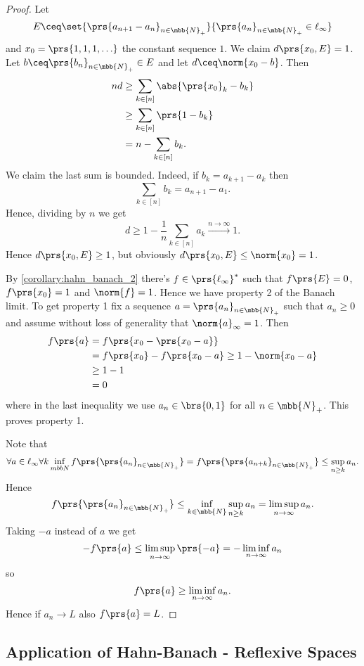 \documentclass[10pt, twoside]{book}
\begin{document}
\begin{proof}
Let
\[E \ceq \set{\prs{a_{n+1} - a_n}_{n \in \mbb{N}_+}}{\prs{a_n}_{n \in \mbb{N}_+} \in \ell_\infty}\]
and $x_0 = \prs{1, 1, 1, \ldots}$ the constant sequence $1$. We claim
$d\prs{x_0, E} = 1$.
Let $b \ceq \prs{b_n}_{n \in \mbb{N}_+} \in E$ and let $d \ceq \norm{x_0 - b}$. Then
\begin{align*}
nd &\geq \sum_{k \in [n]} \abs{\prs{x_0}_k - b_k}
\\&\geq
\sum_{k \in [n]} \prs{1 - b_k}
\\&=
n - \sum_{k \in [n]} b_k \text{.}
\end{align*}
We claim the last sum is bounded. Indeed, if $b_k = a_{k+1} - a_k$ then
\[\sum_{k \in [n]} b_k = a_{n+1} - a_1 \text{.}\]
Hence, dividing by $n$ we get
\[d \geq 1 - \frac{1}{n} \sum_{k \in [n]} a_k \xrightarrow{n \to \infty} 1 \text{.}\]
Hence $d\prs{x_0, E} \geq 1$, but obviously $d\prs{x_0, E} \leq \norm{x_0} = 1$.

By \ref{corollary:hahn_banach_2} there's $f \in \prs{\ell_\infty}^*$ such that $f\prs{E} = 0$, $f\prs{x_0} = 1$ and $\norm{f} = 1$.
Hence we have property 2 of the Banach limit. To get property 1 fix a sequence $a = \prs{a_n}_{n \in \mbb{N}_+}$ such that $a_n \geq 0$ and assume without loss of generality that $\norm{a}_{\infty} = 1$.
Then
\begin{align*}
f\prs{a} &= f\prs{x_0 - \prs{x_0 - a}} \\&= f\prs{x_0} - f\prs{x_0 - a} \geq 1 - \norm{x_0 - a} \\&\geq 1 - 1 \\&= 0
\end{align*}
where in the last inequality we use $a_n \in \brs{0,1}$ for all $n \in \mbb{N}_+$. This proves property 1.

Note that
\begin{align*}
\forall a \in \ell_\infty \forall k \inf_{mbb{N}} f\prs{\prs{a_n}_{n \in \mbb{N}_+}} = f\prs{\prs{a_{n+k}}_{n \in \mbb{N}_+}} \leq \sup_{n \geq k} a_n \text{.}
\end{align*}
Hence
\[f\prs{\prs{a_n}_{n \in \mbb{N}_+}} \leq \inf_{k \in \mbb{N}} \sup_{n \geq k} a_n = \limsup_{n \to \infty} a_n \text{.}\]
Taking $-a$ instead of $a$ we get
\[-f\prs{a} \leq \limsup_{n \to \infty}\prs{-a} = -\liminf_{n \to \infty} a_n\]
so
\[f\prs{a} \geq \liminf_{n\to\infty} a_n \text{.}\]
Hence if $a_n \to L$ also $f\prs{a} = L$.
\end{proof}

\subsection{Application of Hahn-Banach - Reflexive Spaces}
\end{document}
